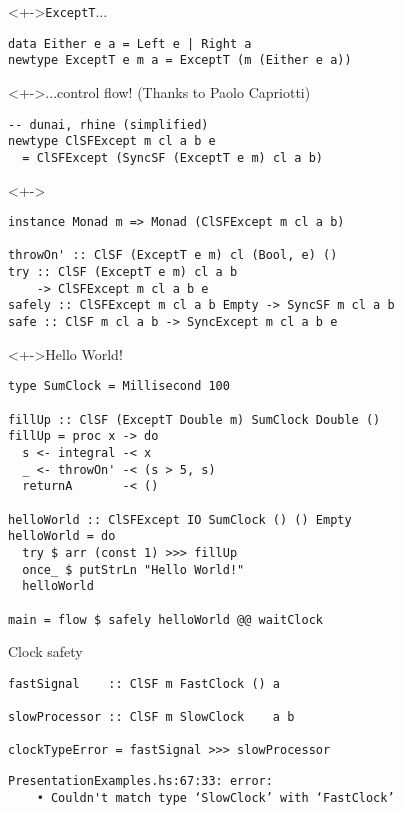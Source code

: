 \documentclass{enigtex-beamer-base}
\begin{document}
\begin{frame}[fragile]
\begin{block}<+->{\texttt{ExceptT}...}
\begin{verbatim}
data Either e a = Left e | Right a
newtype ExceptT e m a = ExceptT (m (Either e a))
\end{verbatim}
\end{block}

\begin{block}<+->{...control flow! (Thanks to Paolo Capriotti)}
\begin{verbatim}
-- dunai, rhine (simplified)
newtype ClSFExcept m cl a b e
  = ClSFExcept (SyncSF (ExceptT e m) cl a b)
\end{verbatim}
\end{block}

\begin{block}<+->{}
\begin{verbatim}
instance Monad m => Monad (ClSFExcept m cl a b)

throwOn' :: ClSF (ExceptT e m) cl (Bool, e) ()
try :: ClSF (ExceptT e m) cl a b
    -> ClSFExcept m cl a b e
safely :: ClSFExcept m cl a b Empty -> SyncSF m cl a b
safe :: ClSF m cl a b -> SyncExcept m cl a b e
\end{verbatim}
\end{block}
\end{frame}

\begin{frame}[fragile]
\begin{block}<+->{Hello World!}
\begin{verbatim}
type SumClock = Millisecond 100

fillUp :: ClSF (ExceptT Double m) SumClock Double ()
fillUp = proc x -> do
  s <- integral -< x
  _ <- throwOn' -< (s > 5, s)
  returnA       -< ()

helloWorld :: ClSFExcept IO SumClock () () Empty
helloWorld = do
  try $ arr (const 1) >>> fillUp
  once_ $ putStrLn "Hello World!"
  helloWorld

main = flow $ safely helloWorld @@ waitClock
\end{verbatim}
\end{block}
\end{frame}

\begin{frame}[fragile]
\begin{block}{Clock safety}
\begin{verbatim}
fastSignal    :: ClSF m FastClock () a

slowProcessor :: ClSF m SlowClock    a b

clockTypeError = fastSignal >>> slowProcessor
\end{verbatim}
\end{block}
\begin{verbatim}
PresentationExamples.hs:67:33: error:
    • Couldn't match type ‘SlowClock’ with ‘FastClock’
\end{verbatim}
\end{frame}
\end{document}
